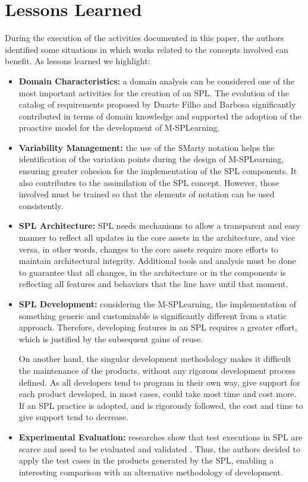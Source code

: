\section{Lessons Learned}\label{section5}

During the execution of the activities documented in this paper, the authors identified some situations in which works related to the concepts involved can benefit. As lessons learned we highlight:

\begin{itemize}
    \item \textbf{Domain Characteristics:} a domain analysis can be considered one of the most important activities for the creation of an SPL. The evolution of the catalog of requirements proposed by Duarte Filho and Barbosa \cite{filho13} significantly contributed in terms of domain knowledge and supported the adoption of the proactive model for the development of M-SPLear\allowbreak ning.
    \item \textbf{Variability Management:} the use of the SMarty notation helps the identification of the variation points during the design of M-SPLear\allowbreak ning, ensuring greater cohesion for the implementation of the SPL components. It also contributes to the assimilation of the SPL concept. However, those involved must be trained so that the elements of notation can be used consistently.
    \item \textbf{SPL Architecture:} SPL needs mechanisms to allow a transparent and easy manner to reflect all updates in the core assets in the architecture, and vice versa, in other words, changes to the core assets require more efforts to maintain architectural integrity. Additional tools and analysis must be done to guarantee that all changes, in the architecture or in the components is reflecting all features and behaviors that the line have until that moment.
    \item \textbf{SPL Development:} considering the M-SPLear\allowbreak ning, the implementation of something generic and customizable is significantly different from a static approach. Therefore, developing features in an SPL requires a greater effort, which is justified by the subsequent gains of reuse.

On another hand, the singular development methodology makes it difficult the maintenance of the products, without any rigorous development process defined. As all developers tend to program in their own way, give support for each product developed, in most cases, could take most time and cost more. If an SPL practice is adopted, and is rigorously followed, the cost and time to give support tend to decrease.
    \item \textbf{Experimental Evaluation:} researches show that test executions in SPL are scarce and need to be evaluated and validated \cite{engstrom11}. Thus, the authors decided to apply the test cases in the products generated by the SPL, enabling a interesting comparison with an alternative methodology of development.


\end{itemize}
